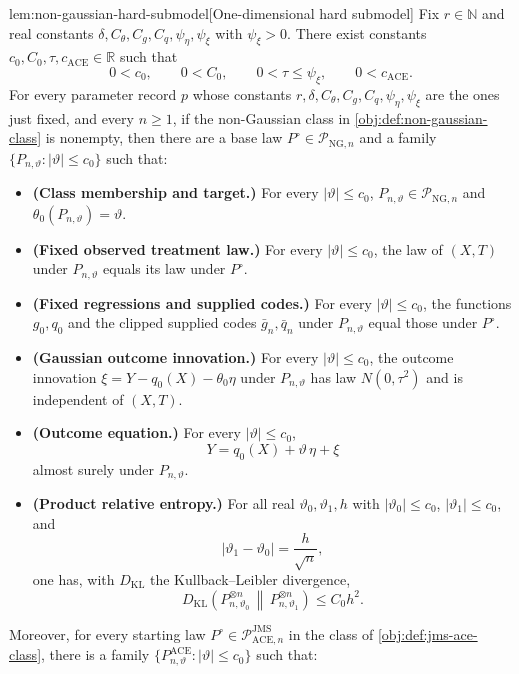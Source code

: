 \begin{lemmav}{lem:non-gaussian-hard-submodel}[One-dimensional hard submodel]
Fix \(r\in\mathbb N\) and real constants
\(\delta,C_{\theta},C_g,C_q,\psi_{\eta},\psi_{\xi}\) with \(\psi_{\xi}>0\). There exist constants
\(c_0,C_0,\tau,c_{\mathrm{ACE}}\in\mathbb R\) such that
\[
0<c_0,\qquad 0<C_0,\qquad 0<\tau\le \psi_{\xi},\qquad 0<c_{\mathrm{ACE}} .
\]
For every parameter record \(p\) whose constants
\(r,\delta,C_{\theta},C_g,C_q,\psi_{\eta},\psi_{\xi}\) are the ones just fixed, and every \(n\ge 1\), if the non-Gaussian class in \cref{obj:def:non-gaussian-class} is nonempty, then there are a base law \(P^{\circ}\in\mathcal P_{\mathrm{NG},n}\) and a family \(\{P_{n,\vartheta}:|\vartheta|\le c_0\}\) such that:
\begin{itemize}
\item \textbf{(Class membership and target.)} For every \(|\vartheta|\le c_0\), \(P_{n,\vartheta}\in\mathcal P_{\mathrm{NG},n}\) and \(\theta_0(P_{n,\vartheta})=\vartheta\).
\item \textbf{(Fixed observed treatment law.)} For every \(|\vartheta|\le c_0\), the law of \((X,T)\) under \(P_{n,\vartheta}\) equals its law under \(P^{\circ}\).
\item \textbf{(Fixed regressions and supplied codes.)} For every \(|\vartheta|\le c_0\), the functions \(g_0,q_0\) and the clipped supplied codes \(\bar g_n,\bar q_n\) under \(P_{n,\vartheta}\) equal those under \(P^{\circ}\).
\item \textbf{(Gaussian outcome innovation.)} For every \(|\vartheta|\le c_0\), the outcome innovation \(\xi=Y-q_0(X)-\theta_0\eta\) under \(P_{n,\vartheta}\) has law \(N(0,\tau^2)\) and is independent of \((X,T)\).
\item \textbf{(Outcome equation.)} For every \(|\vartheta|\le c_0\),
\[
Y=q_0(X)+\vartheta\,\eta+\xi
\]
almost surely under \(P_{n,\vartheta}\).
\item \textbf{(Product relative entropy.)} For all real \(\vartheta_0,\vartheta_1,h\) with \(|\vartheta_0|\le c_0\), \(|\vartheta_1|\le c_0\), and
\[
|\vartheta_1-\vartheta_0|=\frac{h}{\sqrt n},
\]
one has, with \(D_{\mathrm{KL}}\) the Kullback--Leibler divergence,
\[
D_{\mathrm{KL}}\!\left(P_{n,\vartheta_0}^{\otimes n}\,\middle\|\,P_{n,\vartheta_1}^{\otimes n}\right)
\le C_0 h^2 .
\]
\end{itemize}
Moreover, for every starting law \(P^{\circ}\in\mathcal P_{\mathrm{ACE},n}^{\mathrm{JMS}}\) in the class of \cref{obj:def:jms-ace-class}, there is a family \(\{P_{n,\vartheta}^{\mathrm{ACE}}:|\vartheta|\le c_0\}\) such that:

\end{lemmav}
